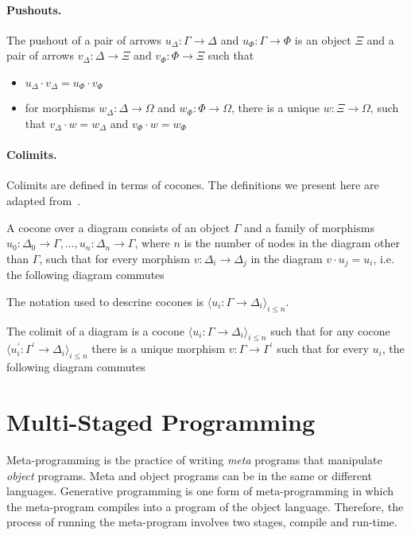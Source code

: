 \paragraph{Pushouts.}
The pushout of a pair of arrows $u_\Delta : \Gamma \to \Delta$ and $u_\Phi : \Gamma \to \Phi$ is an object $\Xi$ and a pair of arrows $v_\Delta : \Delta \to \Xi$ and $v_\Phi : \Phi \to \Xi$ such that 
\begin{itemize}
\item $u_\Delta \cdot v_\Delta = u_\Phi \cdot v_\Phi $
\item for morphisms $w_\Delta : \Delta \to \Omega$ and $w_\Phi : \Phi \to \Omega$, there is a unique $w : \Xi \to \Omega$, such that 
$v_\Delta \cdot w = w_\Delta$ and $v_\Phi \cdot w = w_\Phi$
\end{itemize}


\paragraph{Colimits.}
Colimits are defined in terms of cocones. The definitions we present here are adapted from~\cite{sannella2012foundations}. 

A cocone over a diagram consists of an object $\Gamma$ and a family of morphisms $u_0 : \Delta_0 \to \Gamma, ..., u_n : \Delta_n \to \Gamma$, where $n$ is the number of nodes in the diagram other than $\Gamma$, such that for every morphism $v : \Delta_i \to \Delta_j$ in the diagram $v \cdot u_j = u_i$, i.e. the following diagram commutes 
The notation used to descrine cocones is 
$\langle u_i : \Gamma \to \Delta_i \rangle_{i\leq n}$.

The colimit of a diagram is a cocone  
$\langle u_i : \Gamma \to \Delta_i \rangle_{i\leq n}$ such that for any cocone 
$\langle u_i^{\prime} : \Gamma^{\prime} \to \Delta_i \rangle_{i\leq n}$ there is a unique morphism $v : \Gamma \to \Gamma^\prime$ such that for every $u_i$, the following diagram commutes 

\section{Multi-Staged Programming}
\label{sec:background:msp}
Meta-programming is the practice of writing \emph{meta} programs that manipulate \emph{object} programs. Meta and object programs can be in the same or different languages. Generative programming is one form of meta-programming in which the meta-program compiles into a program of the object language. Therefore, the process of running the meta-program involves two stages, compile and run-time. 

